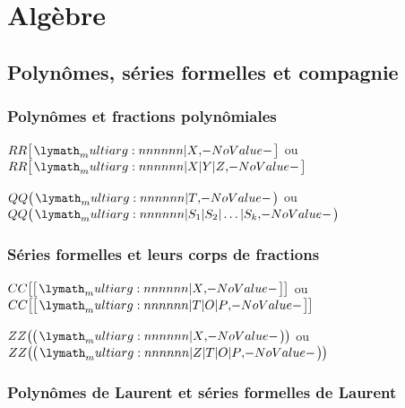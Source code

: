 \documentclass[12pt,a4paper]{article}
\newcommand\ZZ{ZZ}
\newcommand\QQ{QQ}
\newcommand\RR{RR}
\newcommand\CC{CC}
\begin{document}
\section{Algèbre}

\subsection{Polynômes, séries formelles et compagnie}

\subsubsection{Polynômes et fractions polynômiales}


\begin{latexex}
$\setpoly{\RR}{X}$ ou
$\setpoly{\RR}{X | Y | Z}$
\end{latexex}





\begin{latexex}
$\setpolyfrac{\QQ}{T}$ ou
$\setpolyfrac{\QQ}%
             {S_1 | S_2 | \dots | S_k}$
\end{latexex}




\subsubsection{Séries formelles et leurs corps de fractions}


\begin{latexex}
$\setserie{\CC}{X}$ ou
$\setserie{\CC}{T | O | P}$
\end{latexex}





\begin{latexex}
$\setseriefrac{\ZZ}{X}$ ou
$\setseriefrac{\ZZ}{Z | T | O | P}$
\end{latexex}




\subsubsection{Polynômes de Laurent et séries formelles de Laurent}
\end{document}
